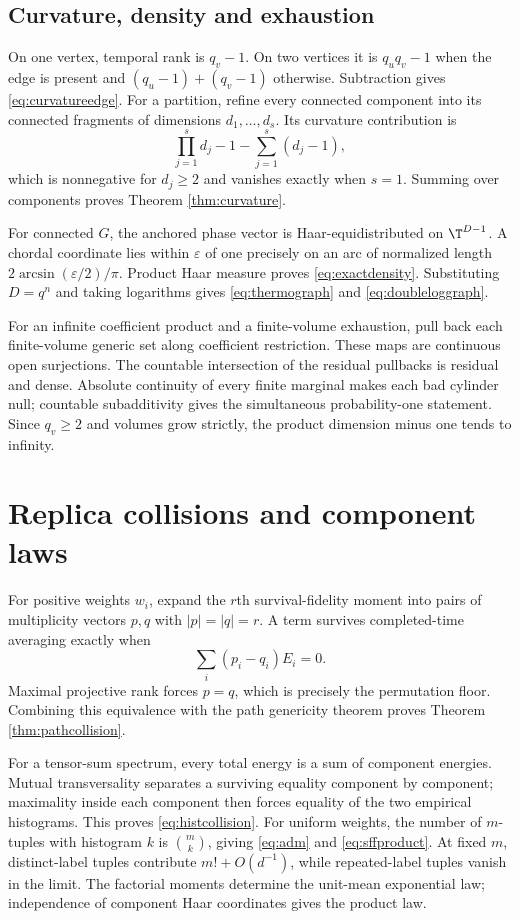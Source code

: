 \subsection{Curvature, density and exhaustion}

On one vertex, temporal rank is $q_v-1$.  On two vertices it is
$q_uq_v-1$ when the edge is present and
$(q_u-1)+(q_v-1)$ otherwise.  Subtraction gives
\eqref{eq:curvatureedge}.  For a partition, refine every connected component
into its connected fragments of dimensions $d_1,\ldots,d_s$.  Its curvature
contribution is
\[
 \prod_{j=1}^s d_j-1-\sum_{j=1}^s(d_j-1),
\]
which is nonnegative for $d_j\ge2$ and vanishes exactly when $s=1$.  Summing
over components proves Theorem \ref{thm:curvature}.

For connected $G$, the anchored phase vector is Haar-equidistributed on
$\T^{D-1}$.  A chordal coordinate lies within $\varepsilon$ of one precisely
on an arc of normalized length
$2\arcsin(\varepsilon/2)/\pi$.  Product Haar measure proves
\eqref{eq:exactdensity}.  Substituting $D=q^n$ and taking logarithms gives
\eqref{eq:thermograph} and \eqref{eq:doubleloggraph}.

For an infinite coefficient product and a finite-volume exhaustion, pull
back each finite-volume generic set along coefficient restriction.  These
maps are continuous open surjections.  The countable intersection of the
residual pullbacks is residual and dense.  Absolute continuity of every
finite marginal makes each bad cylinder null; countable subadditivity gives
the simultaneous probability-one statement.  Since $q_v\ge2$ and volumes
grow strictly, the product dimension minus one tends to infinity.

\section{Replica collisions and component laws}

For positive weights $w_i$, expand the $r$th survival-fidelity moment into
pairs of multiplicity vectors $p,q$ with $|p|=|q|=r$.  A term survives
completed-time averaging exactly when
\[
 \sum_i(p_i-q_i)E_i=0.
\]
Maximal projective rank forces $p=q$, which is precisely the permutation
floor.  Combining this equivalence with the path genericity theorem proves
Theorem \ref{thm:pathcollision}.

For a tensor-sum spectrum, every total energy is a sum of component energies.
Mutual transversality separates a surviving equality component by component;
maximality inside each component then forces equality of the two empirical
histograms.  This proves \eqref{eq:histcollision}.  For uniform weights, the
number of $m$-tuples with histogram $k$ is $\binom{m}{k}$, giving
\eqref{eq:adm} and \eqref{eq:sffproduct}.  At fixed $m$, distinct-label
tuples contribute $m!+O(d^{-1})$, while repeated-label tuples vanish in the
limit.  The factorial moments determine the unit-mean exponential law;
independence of component Haar coordinates gives the product law.

